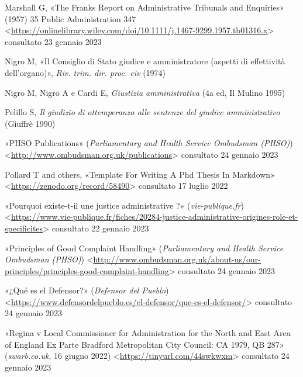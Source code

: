 \documentclass[12pt,it,a4paper,]{report}
\newlength{\cslhangindent}
\newenvironment{CSLReferences}[2] %
 {%
  \setlength{\parindent}{0pt}
  \ifodd #1 \everypar{\setlength{\hangindent}{\cslhangindent}}\ignorespaces\fi
  \ifnum #2 > 0
  \setlength{\parskip}{#2\baselineskip}
  \fi
 }%
 {}
\begin{document}
\begin{CSLReferences}{0}{0}
\leavevmode{}%
Marshall G, {«The Franks Report on Administrative Tribunals and
Enquiries»} (1957) 35 Public Administration 347
\textless{}\url{https://onlinelibrary.wiley.com/doi/10.1111/j.1467-9299.1957.tb01316.x}\textgreater{}
consultato 23 gennaio 2023

\leavevmode{}%
Nigro M, {«Il Consiglio di Stato giudice e amministratore (aspetti di
effettività dell'organo)»}, \emph{Riv. trim. dir. proc. civ} (1974)

\leavevmode{}%
Nigro M, Nigro A e Cardi E, \emph{Giustizia amministrativa} (4a ed, Il
Mulino 1995)

\leavevmode{}%
Pelillo S, \emph{Il giudizio di ottemperanza alle sentenze del giudice
amministrativo} (Giuffrè 1990)

\leavevmode{}%
{«PHSO Publications»} (\emph{Parliamentary and Health Service Ombudsman
(PHSO)})
\textless{}\url{http://www.ombudsman.org.uk/publications}\textgreater{}
consultato 24 gennaio 2023

\leavevmode{}%
Pollard T and others, {«Template For Writing A Phd Thesis In Markdown»}
\textless{}\url{https://zenodo.org/record/58490}\textgreater{}
consultato 17 luglio 2022

\leavevmode{}%
{«Pourquoi existe-t-il une justice administrative ?»}
(\emph{vie-publique.fr})
\textless{}\url{https://www.vie-publique.fr/fiches/20284-justice-administrative-origines-role-et-specificites}\textgreater{}
consultato 22 gennaio 2023

\leavevmode{}%
{«Principles of Good Complaint Handling»} (\emph{Parliamentary and
Health Service Ombudsman (PHSO)})
\textless{}\url{http://www.ombudsman.org.uk/about-us/our-principles/principles-good-complaint-handling}\textgreater{}
consultato 24 gennaio 2023

\leavevmode{}%
{«¿Qué es el Defensor?»} (\emph{Defensor del Pueblo})
\textless{}\url{https://www.defensordelpueblo.es/el-defensor/que-es-el-defensor/}\textgreater{}
consultato 24 gennaio 2023

\leavevmode{}%
{«Regina v Local Commissioner for Administration for the North and East
Area of England Ex Parte Bradford Metropolitan City Council: CA 1979, QB
287»} (\emph{swarb.co.uk}, 16 giugno 2022)
\textless{}\url{https://tinyurl.com/44swkwxm}\textgreater{} consultato
24 gennaio 2023


\end{CSLReferences}
\end{document}
